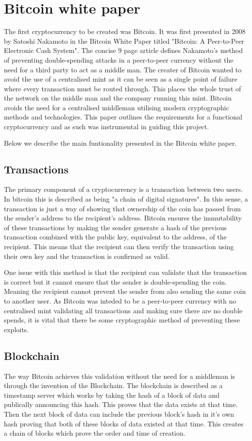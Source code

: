 \documentclass{l4proj}
\begin{document}
\section{Bitcoin white paper}
The first cryptocurrency to be created was Bitcoin. It was first presented in 2008 by Satoshi Nakamoto in the Bitcoin White Paper
titled "Bitcoin: A Peer-to-Peer Electronic Cash System". The concise 9 page article defines Nakamoto's method of preventing
double-spending attacks in a peer-to-peer currency without the need for a third party to act as a middle man. The creater
of Bitcoin wanted to avoid the use of a centralised mint as it can be seen as a single point of failure where every transaction
must be routed through. This places the whole trust of the network on the middle man and the company running this mint. 
Bitcoin avoids the need for a centralised middleman utilising modern cryptographic methods and technologies. This paper 
outlines the requirements for a functional cryptocurrency and as such was instrumental in guiding this project.

Below we describe the main funtionality presented in the Bitcoin white paper.


\subsection{Transactions}
The primary component of a cryptocurrency is a transaction between two users. In bitcoin this is described as being "a
chain of digital signatures". In this sense, a transaction is just a way of showing that ownership of the coin has
passed from the sender's address to the recipient's address. Bitcoin ensures the immutability of these transactions
by making the sender generate a hash of the previous transaction combined with the public key, equivalent to the address,
of the recipient. This means that the recipient can then verify the transaction using their own key and the transaction
is confirmed as valid.

One issue with this method is that the recipient can validate that the transaction is correct but it cannot ensure
that the sender is double-spending the coin. Meaning the recipient cannot prevent the sender from also sending the 
same coin to another user. As Bitcoin was inteded to be a peer-to-peer currency with no centralised mint validating
all transactions and making sure there are no double spends, it is vital that there be some cryptographic method of
preventing these exploits.


\subsection{Blockchain}
The way Bitcoin achieves this validation without the need for a middleman is through the invention of the Blockchain.
The blockchain is described as a timestamp server which works by taking the hash of a block of data and publically
announcing this hash. This proves that the data exists at that time. Then the next block of data can include the
previous block's hash in it's own hash proving that both of these blocks of data existed at that time. This creates 
a chain of blocks which prove the order and time of creation.
\end{document}
